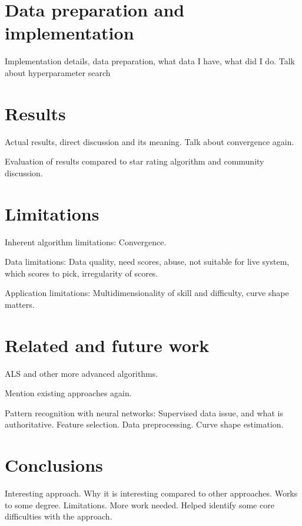 \documentclass[12pt,a4paper]{article}
\begin{document}
\section{Data preparation and implementation}
\label{data_preparation_implementation}

Implementation details, data preparation, what data I have, what did I do.
Talk about hyperparameter search

\section{Results}
\label{results}

Actual results, direct discussion and its meaning. Talk about convergence again.

Evaluation of results compared to star rating algorithm and community discussion.

\section{Limitations}
\label{limitations}

Inherent algorithm limitations: Convergence.

Data limitations: Data quality, need scores, abuse, not suitable for live system, which scores to pick, irregularity of scores.

Application limitations: Multidimensionality of skill and difficulty, curve shape matters.

\section{Related and future work}
\label{related_future_work}

ALS and other more advanced algorithms.

Mention existing approaches again.

Pattern recognition with neural networks: Supervised data issue, and what is authoritative. Feature selection. Data preprocessing. Curve shape estimation. 

\section{Conclusions}
\label{conclusions}

Interesting approach. Why it is interesting compared to other approaches. Works to some degree. Limitations. More work needed. Helped identify some core difficulties with the approach.



\end{document}
